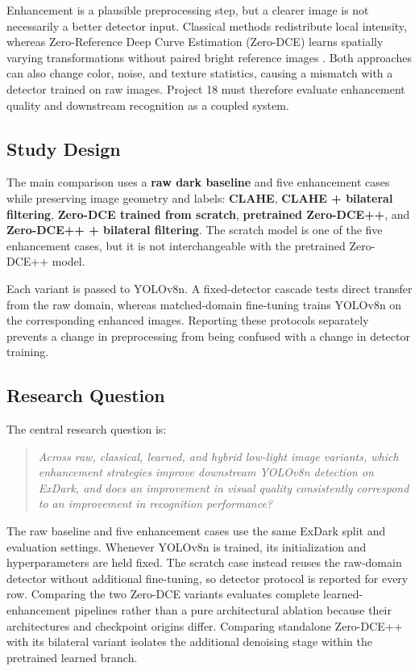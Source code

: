 \documentclass[11pt,a4paper]{article}
\begin{document}
Enhancement is a plausible preprocessing step, but a clearer image is not
necessarily a better detector input. Classical methods redistribute local
intensity, whereas Zero-Reference Deep Curve Estimation (Zero-DCE) learns
spatially varying transformations without paired bright reference images
\cite{guo2020zerodce}. Both approaches can also change color, noise, and texture
statistics, causing a mismatch with a detector trained on raw images. Project
18 must therefore evaluate enhancement quality and downstream recognition as a
coupled system.

\subsection{Study Design}

The main comparison uses a \textbf{raw dark baseline} and five enhancement
cases while preserving image geometry and labels: \textbf{CLAHE},
\textbf{CLAHE + bilateral filtering}, \textbf{Zero-DCE trained from scratch},
\textbf{pretrained Zero-DCE++}, and \textbf{Zero-DCE++ + bilateral filtering}.
The scratch model is one of the five enhancement cases, but it is not
interchangeable with the pretrained Zero-DCE++ model.

Each variant is passed to YOLOv8n. A fixed-detector cascade tests direct transfer
from the raw domain, whereas matched-domain fine-tuning trains YOLOv8n on the
corresponding enhanced images. Reporting these protocols separately prevents a
change in preprocessing from being confused with a change in detector training.

\subsection{Research Question}

The central research question is:

\begin{quote}
\textit{Across raw, classical, learned, and hybrid low-light image variants,
which enhancement strategies improve downstream YOLOv8n detection on ExDark,
and does an improvement in visual quality consistently correspond to an
improvement in recognition performance?}
\end{quote}

The raw baseline and five enhancement cases use the same ExDark split and
evaluation settings. Whenever YOLOv8n is trained, its initialization and
hyperparameters are held fixed. The scratch case instead reuses the raw-domain
detector without additional fine-tuning, so detector protocol is reported for
every row. Comparing the
two Zero-DCE variants evaluates complete learned-enhancement pipelines rather
than a pure architectural ablation because their architectures and checkpoint
origins differ. Comparing standalone Zero-DCE++ with its bilateral variant
isolates the additional denoising stage within the pretrained learned branch.
\end{document}
